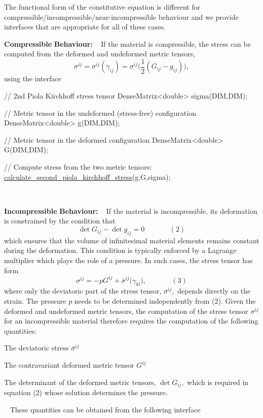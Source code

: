 The functional form of the constitutive equation is different for compressible/incompressible/near-\/incompressible behaviour and we provide interfaces that are appropriate for all of these cases.
\begin{DoxyEnumerate}
\item {\bfseries Compressible} {\bfseries Behaviour\+:} ~\newline
 If the material is compressible, the stress can be computed from the deformed and undeformed metric tensors, \[ \sigma^{ij} = \sigma^{ij}(\gamma_{ij}) = \sigma^{ij}\bigg( \frac{1}{2} (G_{ij} - g_{ij})\bigg), \] using the interface 
\begin{DoxyCode}
\textcolor{comment}{// 2nd Piola Kirchhoff stress tensor}
DenseMatrix<double> sigma(DIM,DIM);

\textcolor{comment}{// Metric tensor in the undeformed (stress-free) configuration}
DenseMatrix<double> g(DIM,DIM);

\textcolor{comment}{// Metric tensor in the deformed  configuration}
DenseMatrix<double> G(DIM,DIM);

\textcolor{comment}{// Compute stress from the two metric tensors:}
\hyperlink{classoomph_1_1ConstitutiveLaw_a93527d910de908035feb8f41b0401065}{calculate\_second\_piola\_kirchhoff\_stress}(g,G,sigma);
\end{DoxyCode}
 ~\newline
 ~\newline
 ~\newline

\item {\bfseries Incompressible} {\bfseries Behaviour\+:} ~\newline
 If the material is incompressible, its deformation is constrained by the condition that \[ \det G_{ij} - \det g_{ij}= 0 \ \ \ \ \ \ \ \ \ \ \ \ \ \ \ \ (2) \] which ensures that the volume of infinitesimal material elements remains constant during the deformation. This condition is typically enforced by a Lagrange multiplier which plays the role of a pressure. In such cases, the stress tensor has form \[ \sigma^{ij} = -p G^{ij} + \overline{\sigma}^{ij}\big(\gamma_{kl}\big), \ \ \ \ \ \ \ \ \ \ \ \ \ \ \ \ (3) \] where only the deviatoric part of the stress tensor, $ \overline{\sigma}^{ij}, $ depends directly on the strain. The pressure $ p $ needs to be determined independently from (2). Given the deformed and undeformed metric tensors, the computation of the stress tensor $ \sigma^{ij} $ for an incompressible material therefore requires the computation of the following quantities\+:
\begin{DoxyItemize}
\item The deviatoric stress $ \overline{\sigma}^{ij} $
\item The contravariant deformed metric tensor $ G^{ij} $
\item The determinant of the deformed metric tensors, $ \det G_{ij}, $ which is required in equation (2) whose solution determines the pressure.
\end{DoxyItemize}~\newline
 These quantities can be obtained from the following interface ~\newline


\end{DoxyEnumerate}
